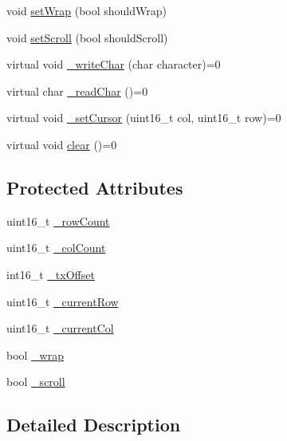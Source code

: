 \begin{DoxyCompactItemize}
\item 
void \hyperlink{class_m_h_v___display___character_a02cd86834aa4446280a590b3b80f0923}{set\-Wrap} (bool should\-Wrap)
\item 
void \hyperlink{class_m_h_v___display___character_a800857f3c5109d3d30886d280873c740}{set\-Scroll} (bool should\-Scroll)
\item 
virtual void \hyperlink{class_m_h_v___display___character_a0708f0d85fdd520debe872089b210ef6}{\-\_\-write\-Char} (char character)=0
\item 
virtual char \hyperlink{class_m_h_v___display___character_ada7e2fa3ad94e7841cb553d60c20e1bc}{\-\_\-read\-Char} ()=0
\item 
virtual void \hyperlink{class_m_h_v___display___character_a014011698be99484d0aef022e6f2f368}{\-\_\-set\-Cursor} (uint16\-\_\-t col, uint16\-\_\-t row)=0
\item 
virtual void \hyperlink{class_m_h_v___display___character_ac33b74b5d4bd8a5ffcceef9863793aa8}{clear} ()=0
\end{DoxyCompactItemize}
\subsection*{\-Protected \-Attributes}
\begin{DoxyCompactItemize}
\item 
uint16\-\_\-t \hyperlink{class_m_h_v___display___character_a284180abef731230b71379f2bd394d26}{\-\_\-row\-Count}
\item 
uint16\-\_\-t \hyperlink{class_m_h_v___display___character_aad0e8cdd562527d5c2ddbb444447d923}{\-\_\-col\-Count}
\item 
int16\-\_\-t \hyperlink{class_m_h_v___display___character_a997a8b28ee03d28dffdb05837fcb2020}{\-\_\-tx\-Offset}
\item 
uint16\-\_\-t \hyperlink{class_m_h_v___display___character_a160c646c69a9d1ec89ae7aae96b2d7e1}{\-\_\-current\-Row}
\item 
uint16\-\_\-t \hyperlink{class_m_h_v___display___character_a476c6bdbc43812bbcc0fdcbf6b9bf1c0}{\-\_\-current\-Col}
\item 
bool \hyperlink{class_m_h_v___display___character_aad907c23ad7592642d5bb30aa26bf251}{\-\_\-wrap}
\item 
bool \hyperlink{class_m_h_v___display___character_aa208e08f734702c3ca2805a974501eb0}{\-\_\-scroll}
\end{DoxyCompactItemize}


\subsection{\-Detailed \-Description}


